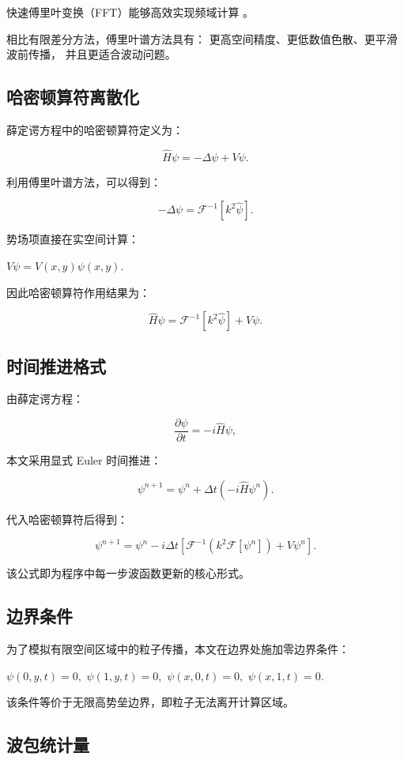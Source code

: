 \documentclass[UTF8,a4paper,12pt]{ctexart}
\begin{document}
快速傅里叶变换（FFT）能够高效实现频域计算
\cite{fft}。

相比有限差分方法，傅里叶谱方法具有：
更高空间精度、更低数值色散、更平滑波前传播，
并且更适合波动问题。

\subsection{哈密顿算符离散化}

薛定谔方程中的哈密顿算符定义为：

\[
\hat H\psi
=
-\Delta\psi+V\psi.
\]

利用傅里叶谱方法，可以得到：

\[
-\Delta\psi
=
\mathcal{F}^{-1}
\left[
k^2\hat\psi
\right].
\]

势场项直接在实空间计算：

$V\psi=V(x,y)\psi(x,y).$

因此哈密顿算符作用结果为：

\[
\hat H\psi
=
\mathcal{F}^{-1}
\left[
k^2\hat\psi
\right]
+
V\psi.
\]

\subsection{时间推进格式}

由薛定谔方程：

\[
\frac{\partial\psi}{\partial t}
=
-i\hat H\psi,
\]

本文采用显式 Euler 时间推进：

\[
\psi^{n+1}
=
\psi^n
+
\Delta t
\left(
-i\hat H\psi^n
\right).
\]

代入哈密顿算符后得到：

\[
\psi^{n+1}
=
\psi^n
-i\Delta t
\left[
\mathcal{F}^{-1}
\left(
k^2\mathcal{F}[\psi^n]
\right)
+
V\psi^n
\right].
\]

该公式即为程序中每一步波函数更新的核心形式。

\subsection{边界条件}

为了模拟有限空间区域中的粒子传播，本文在边界处施加零边界条件：

$\psi(0,y,t)=0,$
$\psi(1,y,t)=0,$
$\psi(x,0,t)=0,$
$\psi(x,1,t)=0.$

该条件等价于无限高势垒边界，即粒子无法离开计算区域。

\subsection{波包统计量}
\end{document}
